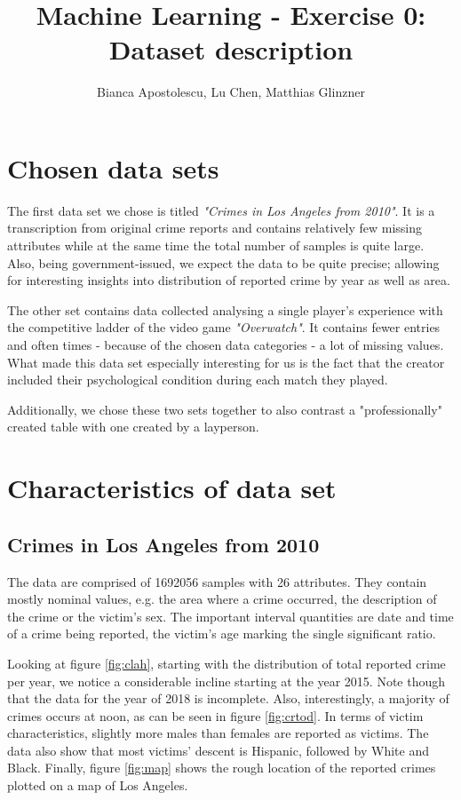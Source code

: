 \documentclass{article}
\begin{document}
\title{Machine Learning - Exercise 0: Dataset description}
\author{Bianca Apostolescu, Lu Chen, Matthias Glinzner}
\date{}
\maketitle

\section*{Chosen data sets}
The first data set we chose is titled \textit{"Crimes in Los Angeles from 2010"}.
It is a transcription from original crime reports and contains relatively few missing attributes while at the same time the total number of samples is quite large.
Also, being government-issued, we expect the data to be quite precise; allowing for interesting insights into distribution of reported crime by year as well as area.

The other set contains data collected analysing a single player's experience with the competitive ladder of the video game \textit{"Overwatch"}.
It contains fewer entries and often times - because of the chosen data categories - a lot of missing values.
What made this data set especially interesting for us is the fact that the creator included their psychological condition during each match they played.

Additionally, we chose these two sets together to also contrast a "professionally" created table with one created by a layperson.

\section*{Characteristics of data set}
\subsection*{Crimes in Los Angeles from 2010}
The data are comprised of 1692056 samples with 26 attributes.
They contain mostly nominal values, e.g. the area where a crime occurred, the description of the crime or the victim's sex.
The important interval quantities are date and time of a crime being reported, the victim's age marking the single significant ratio.

Looking at figure \ref{fig:clah}, starting with the distribution of total reported crime per year, we notice a considerable incline starting at the year 2015.
Note though that the data for the year of 2018 is incomplete.
Also, interestingly, a majority of crimes occurs at noon, as can be seen in figure \ref{fig:crtod}.
In terms of victim characteristics, slightly more males than females are reported as victims.
The data also show that most victims' descent is Hispanic, followed by White and Black.
Finally, figure \ref{fig:map} shows the rough location of the reported crimes plotted on a map of Los Angeles.
\end{document}
